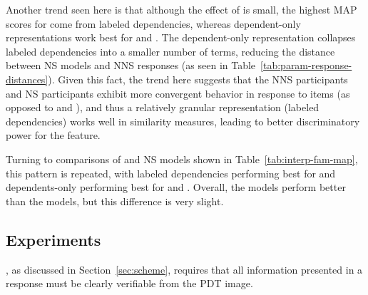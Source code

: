 Another trend seen here is that although the effect of  is small, the highest MAP scores for  come from labeled dependencies, whereas dependent-only representations work best for  and . The dependent-only representation collapses labeled dependencies into a smaller number of terms, reducing the distance between NS models and NNS responses (as seen in Table~\ref{tab:param-response-distances}). Given this fact, the trend here suggests that the NNS participants and  NS participants exhibit more convergent behavior in response to  items (as opposed to  and ), and thus a relatively granular representation (labeled dependencies) works well in similarity measures, leading to better discriminatory power for the  feature.

Turning to comparisons of  and  NS models shown in Table~\ref{tab:interp-fam-map}, this pattern is repeated, with labeled dependencies performing best for  and dependents-only performing best for  and . Overall, the  models perform better than the  models, but this difference is very slight.



\subsection{ Experiments}
\label{sec:map-verif}

, as discussed in Section~\ref{sec:scheme}, requires that all information presented in a response must be clearly verifiable from the PDT image.


